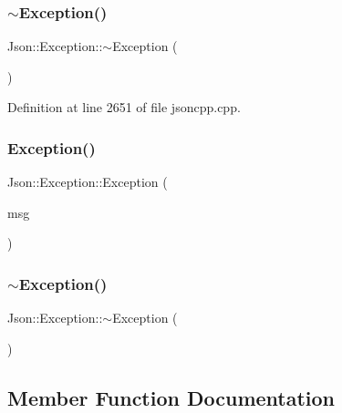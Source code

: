 \subsubsection{\texorpdfstring{$\sim$\+Exception()}{~Exception()}\hspace{0.1cm}{\footnotesize\ttfamily [1/2]}}
{\footnotesize\ttfamily Json\+::\+Exception\+::$\sim$\+Exception (\begin{DoxyParamCaption}{ }\end{DoxyParamCaption})}



Definition at line 2651 of file jsoncpp.\+cpp.

\hypertarget{class_json_1_1_exception_ae764aa42e0755bd4ce9d303e2733fa8f}{}\label{class_json_1_1_exception_ae764aa42e0755bd4ce9d303e2733fa8f} 
\subsubsection{\texorpdfstring{Exception()}{Exception()}\hspace{0.1cm}{\footnotesize\ttfamily [2/2]}}
{\footnotesize\ttfamily Json\+::\+Exception\+::\+Exception (\begin{DoxyParamCaption}\item[{\hyperlink{config_8h_a1e723f95759de062585bc4a8fd3fa4be}{J\+S\+O\+N\+C\+P\+P\+\_\+\+S\+T\+R\+I\+NG} const \&}]{msg }\end{DoxyParamCaption})}

\hypertarget{class_json_1_1_exception_add6af5e0ecdf36f40d7f3554b9786e21}{}\label{class_json_1_1_exception_add6af5e0ecdf36f40d7f3554b9786e21} 
\subsubsection{\texorpdfstring{$\sim$\+Exception()}{~Exception()}\hspace{0.1cm}{\footnotesize\ttfamily [2/2]}}
{\footnotesize\ttfamily Json\+::\+Exception\+::$\sim$\+Exception (\begin{DoxyParamCaption}{ }\end{DoxyParamCaption})}



\subsection{Member Function Documentation}
\hypertarget{class_json_1_1_exception_afaee052fb0c70e07a989c26ad382091c}{}\label{class_json_1_1_exception_afaee052fb0c70e07a989c26ad382091c} 
